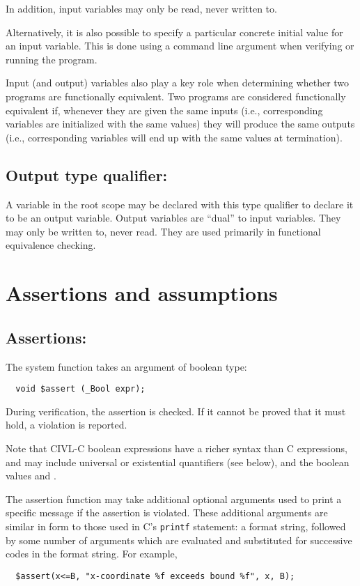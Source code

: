 In addition, input variables may only be read, never written to.

Alternatively, it is also possible to specify a particular concrete
initial value for an input variable.  This is done using a command
line argument when verifying or running the program.

Input (and output) variables also play a key role when determining
whether two programs are functionally equivalent.  Two programs are
considered functionally equivalent if, whenever they are given the
same inputs (i.e., corresponding \cinput{} variables are initialized
with the same values) they will produce the same outputs (i.e.,
corresponding \coutput{} variables will end up with the same values at
termination).

\subsection{Output type qualifier: \coutput}

A variable in the root scope may be declared with this type qualifier
to declare it to be an output variable.  Output variables are ``dual''
to input variables.  They may only be written to, never read.  They
are used primarily in functional equivalence checking.

\section{Assertions and assumptions}

\subsection{Assertions: \cassert}

The system function \cassert{} takes an argument of boolean type:
\begin{verbatim}
  void $assert (_Bool expr);
\end{verbatim}
During verification, the assertion is checked.  If it cannot be proved
that it must hold, a violation is reported.

Note that CIVL-C boolean expressions have a richer syntax than C
expressions, and may include universal or existential quantifiers
(see below), and the boolean values  \ctrue{} and \cfalse{}.

The assertion function may take additional optional arguments used to
print a specific message if the assertion is violated.  These
additional arguments are similar in form to those used in C's
\texttt{printf} statement: a format string, followed by some number of
arguments which are evaluated and substituted for successive codes in
the format string.  For example,
\begin{verbatim}
  $assert(x<=B, "x-coordinate %f exceeds bound %f", x, B); 
\end{verbatim}

